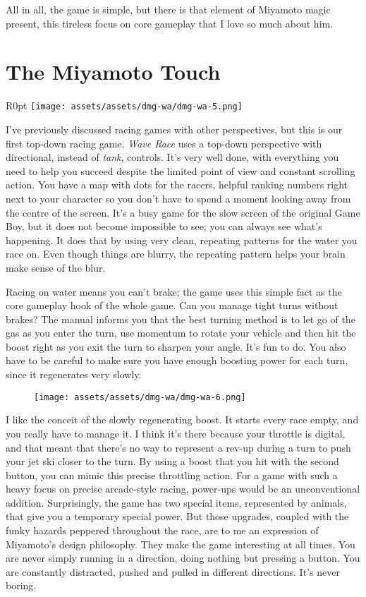 \documentclass{book}
\begin{document}
All in all, the game is simple, but there is that element of Miyamoto magic present, this tireless focus on core gameplay that I love so much about him.

\FloatBarrier\needspace{5pt}\section*{The Miyamoto Touch}\nopagebreak[4]

\begin{wrapfigure}{R}{0pt} \texttt{[image: assets/assets/dmg-wa/dmg-wa-5.png]}\end{wrapfigure}
I’ve previously discussed racing games with other perspectives, but this is our first top-down racing game. \emph{Wave Race} uses a top-down perspective with directional, instead of \emph{tank}, controls. It’s very well done, with everything you need to help you succeed despite the limited point of view and constant scrolling action. You have a map with dots for the racers, helpful ranking numbers right next to your character so you don’t have to spend a moment looking away from the centre of the screen. It’s a busy game for the slow screen of the original Game Boy, but it does not become impossible to see; you can always see what’s happening. It does that by using very clean, repeating patterns for the water you race on. Even though things are blurry, the repeating pattern helps your brain make sense of the blur.

Racing on water means you can’t brake; the game uses this simple fact as the core gameplay hook of the whole game. Can you manage tight turns without brakes? The manual informs you that the best turning method is to let go of the gas as you enter the turn, use momentum to rotate your vehicle and then hit the boost right as you exit the turn to sharpen your angle. It’s fun to do. You also have to be careful to make sure you have enough boosting power for each turn, since it regenerates very slowly.

\begin{figure}[hbt]
\vskip 10pt
\centering \texttt{[image: assets/assets/dmg-wa/dmg-wa-6.png]}
\vskip 6pt
\end{figure}

I like the conceit of the slowly regenerating boost. It starts every race empty, and you really have to manage it. I think it’s there because your throttle is digital, and that meant that there’s no way to represent a rev-up during a turn to push your jet ski closer to the turn. By using a boost that you hit with the second button, you can mimic this precise throttling action. For a game with such a heavy focus on precise arcade-style racing, power-ups would be an unconventional addition. Surprisingly, the game has two special items, represented by animals, that give you a temporary special power. But those upgrades, coupled with the funky hazards peppered throughout the race, are to me an expression of Miyamoto’s design philosophy. They make the game interesting at all times. You are never simply running in a direction, doing nothing but pressing a button. You are constantly distracted, pushed and pulled in different directions. It’s never boring.
\end{document}

